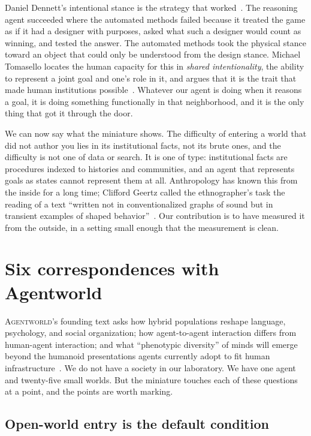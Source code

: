 \documentclass[11pt]{article}
\newcommand{\agentworld}{\textsc{Agentworld}}
\begin{document}
Daniel Dennett's intentional stance is the strategy that worked~\cite{dennett1987intentional}. The
reasoning agent succeeded where the automated methods failed because it treated the game as if it had a
designer with purposes, asked what such a designer would count as winning, and tested the answer.
The automated methods took the physical stance toward an object that could only be understood from the
design stance. Michael Tomasello locates the human capacity for this in \emph{shared intentionality}, the
ability to represent a joint goal and one's role in it, and argues that it is the trait that made human
institutions possible~\cite{tomasello2014natural}. Whatever our agent is doing when it reasons a goal, it
is doing something functionally in that neighborhood, and it is the only thing that got it through the door.

We can now say what the miniature shows. The difficulty of entering a world that did not author you lies
in its institutional facts, not its brute ones, and the difficulty is not one of data or search. It is
one of type: institutional facts are procedures indexed to histories and communities, and an agent that
represents goals as states cannot represent them at all. Anthropology has known this from the inside
for a long time; Clifford Geertz called the ethnographer's task the reading of a text ``written not in
conventionalized graphs of sound but in transient examples of shaped behavior''~\cite{geertz1973interpretation}.
Our contribution is to have measured it from the outside, in a setting small enough that the measurement
is clean.

\section{Six correspondences with Agentworld}
\label{sec:correspondences}

\agentworld{}'s founding text asks how hybrid populations reshape language, psychology, and social
organization; how agent-to-agent interaction differs from human-agent interaction; and what ``phenotypic
diversity'' of minds will emerge beyond the humanoid presentations agents currently adopt to fit human
infrastructure~\cite{agentworld_cfp}. We do not have a society in our laboratory. We have one agent and
twenty-five small worlds. But the miniature touches each of these questions at a point, and the points
are worth marking.

\subsection{Open-world entry is the default condition}
\end{document}
